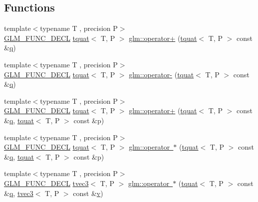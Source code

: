 \subsection*{Functions}
\begin{DoxyCompactItemize}
\item 
{\footnotesize template$<$typename T , precision P$>$ }\\\mbox{\hyperlink{setup_8hpp_ab2d052de21a70539923e9bcbf6e83a51}{G\+L\+M\+\_\+\+F\+U\+N\+C\+\_\+\+D\+E\+CL}} \mbox{\hyperlink{structglm_1_1tquat}{tquat}}$<$ T, P $>$ \mbox{\hyperlink{group__gtc__quaternion_ga6443d80d8429baec64193d0e31e580c8}{glm\+::operator+}} (\mbox{\hyperlink{structglm_1_1tquat}{tquat}}$<$ T, P $>$ const \&\mbox{\hyperlink{glad_8h_a514729309336df22bcc8eda979d6ced4}{q}})
\item 
{\footnotesize template$<$typename T , precision P$>$ }\\\mbox{\hyperlink{setup_8hpp_ab2d052de21a70539923e9bcbf6e83a51}{G\+L\+M\+\_\+\+F\+U\+N\+C\+\_\+\+D\+E\+CL}} \mbox{\hyperlink{structglm_1_1tquat}{tquat}}$<$ T, P $>$ \mbox{\hyperlink{group__gtc__quaternion_ga76d2d3e18c09dbd336ba90b498fefbba}{glm\+::operator-\/}} (\mbox{\hyperlink{structglm_1_1tquat}{tquat}}$<$ T, P $>$ const \&\mbox{\hyperlink{glad_8h_a514729309336df22bcc8eda979d6ced4}{q}})
\item 
{\footnotesize template$<$typename T , precision P$>$ }\\\mbox{\hyperlink{setup_8hpp_ab2d052de21a70539923e9bcbf6e83a51}{G\+L\+M\+\_\+\+F\+U\+N\+C\+\_\+\+D\+E\+CL}} \mbox{\hyperlink{structglm_1_1tquat}{tquat}}$<$ T, P $>$ \mbox{\hyperlink{group__gtc__quaternion_ga517657374d8ca180d63c33ff9430518a}{glm\+::operator+}} (\mbox{\hyperlink{structglm_1_1tquat}{tquat}}$<$ T, P $>$ const \&\mbox{\hyperlink{glad_8h_a514729309336df22bcc8eda979d6ced4}{q}}, \mbox{\hyperlink{structglm_1_1tquat}{tquat}}$<$ T, P $>$ const \&p)
\item 
{\footnotesize template$<$typename T , precision P$>$ }\\\mbox{\hyperlink{setup_8hpp_ab2d052de21a70539923e9bcbf6e83a51}{G\+L\+M\+\_\+\+F\+U\+N\+C\+\_\+\+D\+E\+CL}} \mbox{\hyperlink{structglm_1_1tquat}{tquat}}$<$ T, P $>$ \mbox{\hyperlink{group__gtc__quaternion_ga34388abcfaea2b9328538c35fad4cceb}{glm\+::operator $\ast$}} (\mbox{\hyperlink{structglm_1_1tquat}{tquat}}$<$ T, P $>$ const \&\mbox{\hyperlink{glad_8h_a514729309336df22bcc8eda979d6ced4}{q}}, \mbox{\hyperlink{structglm_1_1tquat}{tquat}}$<$ T, P $>$ const \&p)
\item 
{\footnotesize template$<$typename T , precision P$>$ }\\\mbox{\hyperlink{setup_8hpp_ab2d052de21a70539923e9bcbf6e83a51}{G\+L\+M\+\_\+\+F\+U\+N\+C\+\_\+\+D\+E\+CL}} \mbox{\hyperlink{structglm_1_1tvec3}{tvec3}}$<$ T, P $>$ \mbox{\hyperlink{group__gtc__quaternion_ga9899f835a115424e711bfd1e793a9df7}{glm\+::operator $\ast$}} (\mbox{\hyperlink{structglm_1_1tquat}{tquat}}$<$ T, P $>$ const \&\mbox{\hyperlink{glad_8h_a514729309336df22bcc8eda979d6ced4}{q}}, \mbox{\hyperlink{structglm_1_1tvec3}{tvec3}}$<$ T, P $>$ const \&\mbox{\hyperlink{glad_8h_a14cfbe2fc2234f5504618905b69d1e06}{v}})

\end{DoxyCompactItemize}
